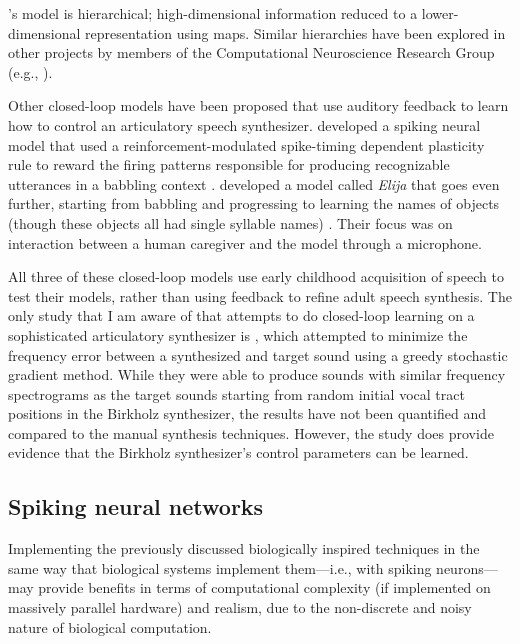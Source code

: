 \documentclass{article}
\begin{document}
\citeauthor{kroger2009}'s model
is hierarchical; high-dimensional information
reduced to a lower-dimensional representation
using maps.
Similar hierarchies have been explored
in other projects by members of the
Computational Neuroscience Research Group
(e.g., \citealp{eliasmith2012,dewolf2011}).

Other closed-loop models
have been proposed
that use auditory feedback
to learn how to control
an articulatory speech synthesizer.
\citeauthor{warlaumont2012}
developed a spiking neural model
that used a reinforcement-modulated
spike-timing dependent plasticity rule
to reward the firing patterns
responsible for producing
recognizable utterances
in a babbling context
\citep{warlaumont2012,warlaumont2013}.
\citeauthor{howard2011} developed
a model called \textit{Elija}
that goes even further,
starting from babbling
and progressing to learning
the names of objects
(though these objects all had
single syllable names) \citep{howard2011}.
Their focus was on interaction
between a human caregiver
and the model through a microphone.

All three of these closed-loop models
use early childhood acquisition of speech
to test their models,
rather than using feedback
to refine adult speech synthesis.
The only study that I am aware of
that attempts to do closed-loop learning
on a sophisticated articulatory synthesizer
is \citet{prom2013}, which attempted
to minimize the frequency error
between a synthesized and target sound
using a greedy stochastic gradient method.
While they were able to produce
sounds with similar frequency spectrograms
as the target sounds starting from
random initial vocal tract positions
in the Birkholz synthesizer,
the results have not been quantified
and compared to the manual
synthesis techniques.
However, the study does provide
evidence that the Birkholz synthesizer's
control parameters can be learned.

\subsection{Spiking neural networks}
\label{subsec:spiking}

Implementing the previously discussed
biologically inspired techniques in the same way
that biological systems implement
them---i.e., with spiking neurons---may
provide benefits in terms of
computational complexity
(if implemented on massively parallel hardware)
and realism, due to the non-discrete
and noisy nature of biological computation.
\end{document}
